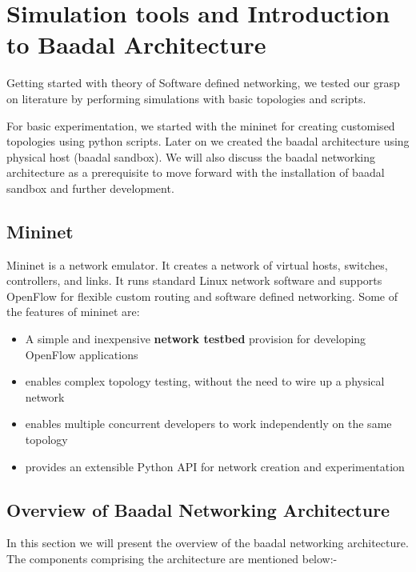 \chapter{Simulation tools and Introduction to Baadal Architecture}

Getting started with theory of Software defined networking, we tested our grasp on literature by performing simulations with basic topologies and scripts. 

For basic experimentation, we started with the mininet for creating customised topologies using python scripts. Later on we created the baadal architecture using physical host (baadal sandbox).
We will also discuss the baadal networking architecture as a prerequisite to move forward with the installation of baadal sandbox and further development.

\section{Mininet}

Mininet is a network emulator. It creates a network of virtual hosts, switches, controllers, and links. It runs standard Linux network software and supports OpenFlow for flexible custom routing and software defined networking. Some of the features of mininet are: 
\begin{itemize}
    \item A simple and inexpensive \textbf{network testbed} provision for developing OpenFlow applications
    \item enables complex topology testing, without the need to wire up a physical network
    \item enables multiple concurrent developers to work independently on the same topology
    \item provides an extensible Python API for network creation and experimentation
\end{itemize}

\section{Overview of Baadal Networking Architecture}
In this section we will present the overview of the baadal networking architecture. The components comprising the architecture are mentioned below:-


